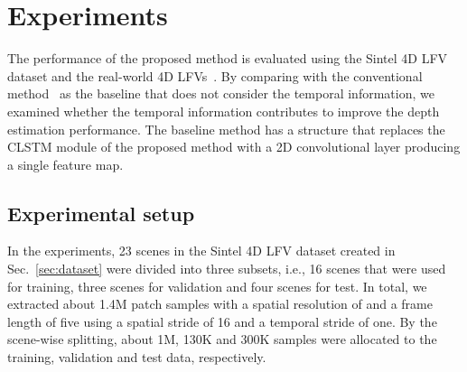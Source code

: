 \documentclass[]{spie}
\newcommand{\jtextd}[1]{}
\begin{document}
\section{Experiments}
\jtextd{
   提案手法の有効性を検証するために，作成したSintel 4D LFVsデータセットお
   よび実撮影4D LFVsを用いて実験を行った．
奥行き推定に時間情報を考慮しない従来手法~\cite{faluvegi20193d}と比較す
  ることで，時系列情報の利用が奥行き推定の精度向上に寄与するかどうかを検
  討した．
}
The performance of the proposed method is 
evaluated using the Sintel 4D LFV dataset
and the real-world 4D LFVs~\cite{wang2017light}.
By comparing with the conventional method~\cite{faluvegi20193d} as the
baseline that does not consider the temporal information, we examined
whether the temporal information contributes to improve the depth
estimation performance.
The baseline method has a structure that replaces the CLSTM module of
the proposed method with a 2D convolutional layer producing a single
feature map.



\subsection{Experimental setup}
\jtextd{
  本実験ではSec.~\ref{sec:dataset}で作成したSintel 4D LFVsデータセットに
  含まれる23シーンを学習用16シーン，検証用3シーン，テスト用4シーンに分割して使用した．
  また，パッチによる学習を行うために，空間分解能が，
  フレーム数が5になるように，16の空間ストライド，1の時間ストライドを使用して
  約1.4M個のパッチサンプルを作成した．
  シーン単位の分割により，約1Mサンプルを学習データに割り当て，
  検証データとテストデータにはそれぞれ約130Kサンプル，約300Kサンプルを割り当てた．
}

In the experiments, 23 scenes in the Sintel 4D LFV dataset 
created in Sec.~\ref{sec:dataset} 
were divided into three subsets, i.e., 16 scenes that were used for training, 
three scenes for validation and four scenes for test.
In total, we extracted about 1.4M patch samples with a spatial
resolution of  and a frame length of five using a
spatial stride of 16 and a temporal stride of one.
By the scene-wise splitting, about 1M, 130K and 300K samples were
allocated to the training, validation and test data, respectively.


\jtextd{
  提案手法は，ネットワーク全体を包括的に訓練することが可能であり，
  本実験ではepochの上限を20とした．
Adam optimizer~\cite{kingma2014adam}を用い，バッチサイズを64に設定した．
  初期学習率を0.0005に設定し，10，15epochで0.1倍ずつ減少させることとした．
  また，損失関数の重み付け係数，は，に設定した．
  提案手法はTensorFlowをバックエンドとするKerasを使用して実装し，
  学習は1枚のNVIDIA GTX 1080Tiを搭載した計算機上で約4日を要した．
}
\end{document}
